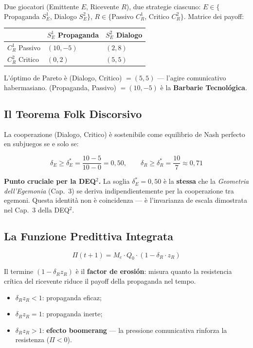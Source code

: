 Due giocatori (Emittente \(E\), Ricevente \(R\)), due strategie
ciascuno: \(E \in \{\)Propaganda \(S^1_E\), Dialogo \(S^2_E\}\),
\(R \in \{\)Passivo \(C^1_R\), Critico \(C^2_R\}\). Matrice dei payoff:

{\def\LTcaptype{none} %
{\small\begin{longtable}[]{@{}lll@{}}
\toprule\noalign{}
& \(S^1_E\) Propaganda & \(S^2_E\) Dialogo \\
\midrule\noalign{}
\endhead
\bottomrule\noalign{}
\endlastfoot
\(C^1_R\) Passivo & \((10, -5)\) & \((2, 8)\) \\
\(C^2_R\) Critico & \((0, 2)\) & \((5, 5)\) \\
\end{longtable}}
}

L'óptimo de Pareto è (Dialogo, Critico) \(= (5, 5)\) --- l'agire
comunicativo habermasiano. (Propaganda, Passivo) \(= (10, -5)\) è la
\textbf{Barbarie Tecnológica}.

\subsection{Il Teorema Folk
Discorsivo}\label{il-folk-theorem-discorsivo}

\Proved{} La cooperazione (Dialogo, Critico) è sostenibile come
equilibrio de Nash perfecto en subjuegos se e solo se:

\[
\delta_E \geq \delta^*_E = \frac{10 - 5}{10 - 0} = 0{,}50, \qquad \delta_R \geq \delta^*_R = \frac{10}{7} \approx 0{,}71
\]

\Hypoth{} \textbf{Punto cruciale per la DEQ$^2$.} La soglia
\(\delta^*_E = 0{,}50\) è la \textbf{stessa} che la \emph{Geometria
dell'Egemonia} (Cap.~3) se deriva indipendientemente per la cooperazione tra
egemoni. Questa identità non è coincidenza --- è l'invarianza de escala
dimostrata nel Cap.~3 della DEQ$^2$.

\subsection{La Funzione Predittiva
Integrata}\label{la-funzione-predittiva-integrata}

\[
\boxed{\Pi(t+1) = M_e \cdot Q_0 \cdot (1 - \delta_R \cdot z_R)}
\]

Il termine \((1 - \delta_R z_R)\) è il \textbf{factor de erosión}:
misura quanto la resistencia crítica del ricevente riduce il payoff della
propaganda nel tempo.

\begin{itemize}
\tightlist
\item
  \(\delta_R z_R < 1\): propaganda eficaz;
\item
  \(\delta_R z_R = 1\): propaganda inerte;
\item
  \(\delta_R z_R > 1\): \textbf{efecto boomerang} --- la pressione
  comunicativa rinforza la resistenza (\(\Pi < 0\)).
\end{itemize}

